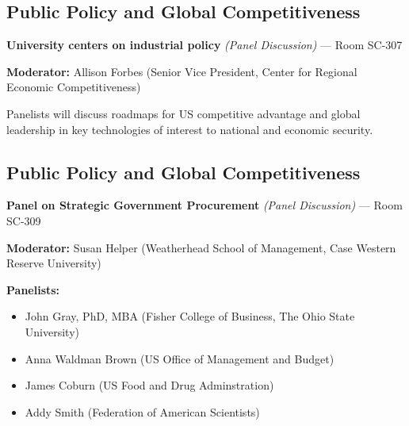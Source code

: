 \documentclass[
  10pt,
  letterpaper,
  DIV=11,
  numbers=noendperiod]{scrartcl}
\providecommand{\tightlist}{%
  \setlength{\itemsep}{0pt}\setlength{\parskip}{0pt}}\usepackage{longtable,booktabs,array}
\begin{document}
\subsection{\texorpdfstring{\textcolor{policy}{Public Policy and Global Competitiveness}}{}}\label{section-48}

\textbf{University centers on industrial policy} \emph{(Panel
Discussion)} --- Room SC-307

\textbf{Moderator:} Allison Forbes (Senior Vice President, Center for
Regional Economic Competitiveness)

Panelists will discuss roadmaps for US competitive advantage and global
leadership in key technologies of interest to national and economic
security.

\subsection{\texorpdfstring{\textcolor{policy}{Public Policy and Global Competitiveness}}{}}\label{section-49}

\textbf{Panel on Strategic Government Procurement} \emph{(Panel
Discussion)} --- Room SC-309

\textbf{Moderator:} Susan Helper (Weatherhead School of Management, Case
Western Reserve University)

\textbf{Panelists:}

\begin{itemize}
\tightlist
\item
  John Gray, PhD, MBA (Fisher College of Business, The Ohio State
  University)
\item
  Anna Waldman Brown (US Office of Management and Budget)
\item
  James Coburn (US Food and Drug Adminstration)
\item
  Addy Smith (Federation of American Scientists)
\end{itemize}
\end{document}
